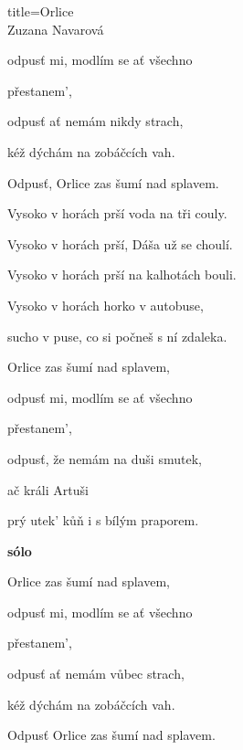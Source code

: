 \begin{song}{title=\predtitle\centering Orlice \\\large Zuzana Navarová  \vspace*{-0.3cm}}
\begin{centerjustified}
\begin{varwidth}[t]{0.5\textwidth}
	odpusť mi, modlím se ať všechno 

	přestanem', 
	
	odpusť ať nemám nikdy strach, 
	
	kéž dýchám na zobáčcích vah. 
	
	Odpusť, Orlice zas šumí nad splavem. 
	
	Vysoko v horách prší voda na tři couly.
	
	Vysoko v horách prší, Dáša už se choulí. 
	
	Vysoko v horách prší na kalhotách bouli. 
	
	Vysoko v horách horko v autobuse, 

	sucho v puse, co si počneš s ní zdaleka. 
	
\sloka
	Orlice zas šumí nad splavem, 
	
	odpusť mi, modlím se ať všechno 

	přestanem', 
	
	odpusť, že nemám na duši smutek, 

	ač králi Artuši 
	
	prý utek' kůň i s bílým praporem. 
	
\textbf{sólo}

\sloka
	Orlice zas šumí nad splavem, 
	
	odpusť mi, modlím se ať všechno 

	přestanem', 
	
	odpusť ať nemám vůbec strach,
	
	kéž dýchám na zobáčcích vah.
	
	Odpusť Orlice zas šumí nad splavem.
\end{varwidth}
	
\end{centerjustified}
\setcounter{Slokočet}{0}
\end{song}

